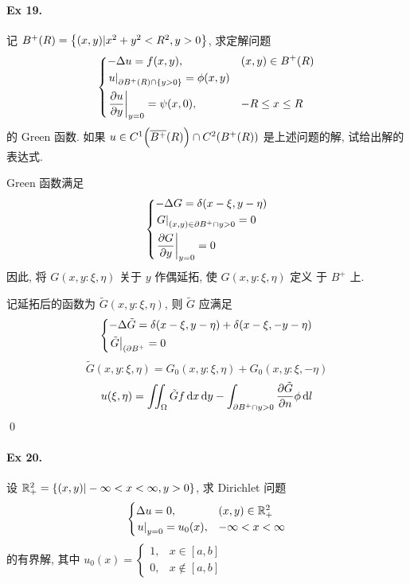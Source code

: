 \paragraph{Ex 19.}
记 $B^{+}(R) = {\left\{ {(x, y)| x^2 + y^2 < R^2, y > 0} \right\}}$, 求定解问题
\[\begin{dcases}
-\Delta u = f(x, y), & (x, y) \in B^{+}(R) \\
{\left.{u} \right|}_{\partial B^{+}(R) \cap \{y>0\}} = \phi(x, y) \\
{\left.{{\frac{\partial {u}}{\partial {y}}}} \right|}_{y=0} = \psi(x, 0), & -R \leq x \leq R
\end{dcases} \]
的 Green 函数. 如果
$u \in C^1{\left( {\overline{B^{+}}{\left( {R} \right)}} \right)} \cap C^2{\left( {B^{+}(R)} \right)}$
是上述问题的解, 试给出解的表达式.

\begin{solution}
Green 函数满足
\[\begin{dcases}
-\Delta G = \delta(x - \xi, y - \eta) \\
{\left.{G} \right|}_{(x, y) \in \partial B^{+} \cap {y>0}} = 0 \\
{\left.{{\frac{\partial {G}}{\partial {y}}}} \right|}_{y=0} = 0
\end{dcases} \]
因此, 将 $G(x, y : \xi, \eta)$ 关于 $y$ 作偶延拓, 使 $G(x, y : \xi, \eta)$ 定义
于 $B^{+}$ 上.

记延拓后的函数为 $\tilde{G}(x, y : \xi, \eta)$, 则 $\tilde{G}$ 应满足
\[\begin{dcases}
-\Delta \tilde{G} = \delta(x - \xi, y - \eta) + \delta(x - \xi, -y - \eta) \\
{\left.{\tilde{G}} \right|}_{(\partial B^{+}} = 0
\end{dcases} \]
\[ \tilde{G}(x, y : \xi, \eta)=G_0(x, y : \xi, \eta)+G_0(x, y : \xi, -\eta) \]
\[ u(\xi, \eta) = \iint_\Omega \tilde{G}f\operatorname{d\!} x\operatorname{d\!} y
-\int_{\partial B^{+} \cap {y>0}} {\frac{\partial {\tilde{G}}}{\partial {n}}}\phi \operatorname{d\!} l \]
\qed
\end{solution}
\paragraph{Ex 20.}
设 ${\mathbb R}^2_{+} = {\left\{ {(x, y)|-\infty<x<\infty, y>0} \right\}}$, 求 Dirichlet
问题
\[\begin{cases}
\Delta u = 0, & (x, y) \in {\mathbb R}^2_{+} \\
{\left.{u} \right|}_{y=0} = u_0(x), & -\infty < x < \infty
\end{cases} \]
的有界解, 其中
$u_0(x) = \begin{cases}1, & x\in[a, b] \\ 0, & x \notin[a, b]\end{cases}$

